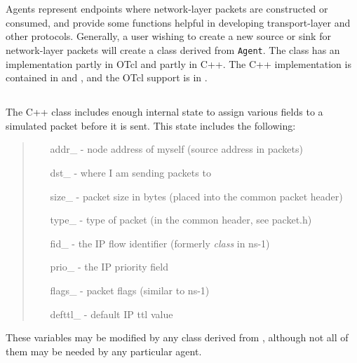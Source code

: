 %
%
%
\chapter{}

Agents represent endpoints where network-layer
packets are constructed or consumed, and provide
some functions helpful in developing transport-layer and other
protocols.
Generally, a user wishing to create a new
source or sink for network-layer packets
will create a class derived from {\tt Agent}.
The class  has an implementation partly in
OTcl and partly in C++.
The C++ implementation is contained in  and
, and the OTcl support is in
.

\section{}

The C++ class  includes enough internal state
to assign various fields to a simulated packet before
it is sent.
This state includes the following:
\begin{quote}
\begin{itemize}
        \item[addr\_] - node address of myself (source address in packets)
        \item[dst\_] - where I am sending packets to
        \item[size\_] - packet size in bytes (placed into the common packet header)
        \item[type\_] - type of packet (in the common header, see packet.h)
        \item[fid\_] - the IP flow identifier (formerly {\em class} in ns-1)
        \item[prio\_] - the IP priority field
	\item[flags\_] - packet flags (similar to ns-1)
	\item[defttl\_] - default IP ttl value
\end{itemize}
\end{quote}
These variables may be modified by any class derived from ,
although not all of them may be needed by any particular agent.

